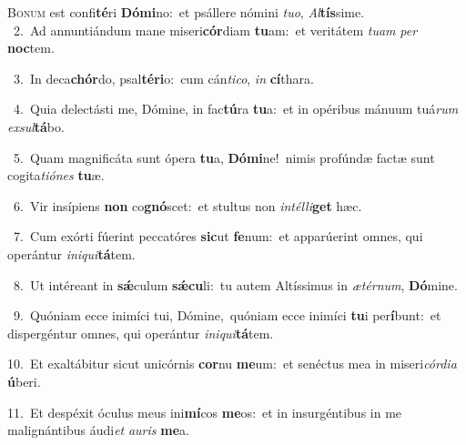 \lettrine{\initial\textcolor{\initialcolor}{B}}{onum} est confi\-\textbf{té}\-ri \textbf{Dó}\-\textbf{mi}no:~\star et psállere nómini \textit{tu}\-\textit{o}, \textit{Al}\-\textbf{tís}sime.\\
{\numbfont\textcolor{\numbcolor}{~2.}}~Ad annuntiándum mane miseri\-\textbf{cór}\-diam \textbf{tu}\-am:~\star et veritátem \textit{tu}\-\textit{am} \textit{per} \textbf{noc}\-tem.\par
{\numbfont\textcolor{\numbcolor}{~3.}}~In deca\-\textbf{chór}\-do, psal\-\textbf{té}\-\textbf{ri}o:~\star cum cán\-\textit{ti}\-\textit{co}, \textit{in} \textbf{cí}\-thara.\par
{\numbfont\textcolor{\numbcolor}{~4.}}~Quia delectásti me, Dómine, in fac\-\textbf{tú}\-ra \textbf{tu}\-a:~\star et in opéribus mánuum tuá\textit{rum} \textit{ex}\-\textit{sul}\textbf{tá}bo.\par
{\numbfont\textcolor{\numbcolor}{~5.}}~Quam magnificáta sunt ópera \textbf{tu}\-a, \textbf{Dó}\-\textbf{mi}ne!~\star nimis profúndæ factæ sunt cogita\-\textit{ti}\-\textit{ó}\textit{nes} \textbf{tu}\-æ.\par
{\numbfont\textcolor{\numbcolor}{~6.}}~Vir insípiens \textbf{non} co\-\textbf{gnó}\-scet:~\star et stultus non \textit{in}\-\textit{tél}\textit{li}\textbf{get} hæc.\par
{\numbfont\textcolor{\numbcolor}{~7.}}~Cum exórti fúerint peccatóres \textbf{sic}\-ut \textbf{fe}\-num:~\star et apparúerint omnes, qui operántur \textit{in}\-\textit{i}\textit{qui}\textbf{tá}tem.\par
{\numbfont\textcolor{\numbcolor}{~8.}}~Ut intéreant in \textbf{sǽ}\-culum \textbf{sǽ}\-\textbf{cu}li:~\star tu autem Altíssimus in \textit{æ}\-\textit{tér}\textit{num}, \textbf{Dó}\-mine.\par
{\numbfont\textcolor{\numbcolor}{~9.}}~Quóniam ecce inimíci tui, Dómine,~\dagger quóniam ecce inimíci \textbf{tu}\-i per\-\textbf{í}\-bunt:~\star et dispergéntur omnes, qui operántur \textit{in}\-\textit{i}\textit{qui}\textbf{tá}tem.\par
{\numbfont\textcolor{\numbcolor}{10.}}~Et exaltábitur sicut unicórnis \textbf{cor}\-nu \textbf{me}\-um:~\star et senéctus mea in miseri\-\textit{cór}\-\textit{di}\textit{a} \textbf{ú}\-beri.\par
{\numbfont\textcolor{\numbcolor}{11.}}~Et despéxit óculus meus ini\-\textbf{mí}\-cos \textbf{me}\-os:~\star et in insurgéntibus in me malignántibus áudi\textit{et} \textit{au}\-\textit{ris} \textbf{me}\-a.\par
